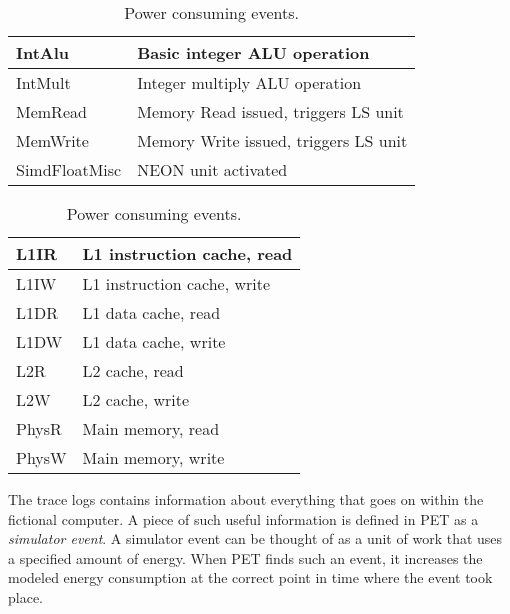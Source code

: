 \begin{table}[ht]
    \centering
    \begin{minipage}[b]{\linewidth}
        \centering
        \begin{tabular}{|l|l|}
            \hline
            IntAlu      & Basic integer ALU operation\\
            \hline
            IntMult     & Integer multiply ALU operation \\
            \hline
            MemRead     & Memory Read issued, triggers LS unit \\
            \hline
            MemWrite    & Memory Write issued, triggers LS unit \\
            \hline
            SimdFloatMisc     & NEON unit activated \\
            \hline
        \end{tabular}
    \end{minipage}

    \begin{minipage}[b]{\linewidth}
        \centering
        \begin{tabular}{|l|l|}
            \hline
            L1IR    & L1 instruction cache, read \\
            \hline
            L1IW    & L1 instruction cache, write \\
            \hline
            L1DR    & L1 data cache, read \\
            \hline
            L1DW    & L1 data cache, write \\
            \hline
            L2R     & L2 cache, read \\
            \hline
            L2W     & L2 cache, write \\
            \hline
            PhysR   & Main memory, read \\
            \hline
            PhysW   & Main memory, write \\
            \hline
        \end{tabular}
    \end{minipage}
    \caption{Power consuming events.}
    \label{tbl:events}
\end{table}

The trace logs contains information about everything that goes on within the
fictional computer. A piece of such useful information is defined in PET as a
\emph{simulator event}. A simulator event can be thought of as a unit of work
that uses a specified amount of energy. When PET finds such an event, it
increases the modeled energy consumption at the correct point in time where the
event took place.

